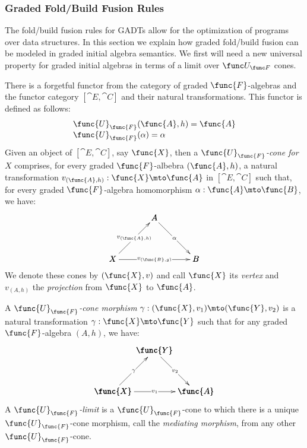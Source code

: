 \subsubsection{Graded Fold/Build Fusion Rules}
\label{subsubsec:graded_fold_build_fusion_rules}
% 
The fold/build fusion rules for GADTs allow for the optimization of
programs over data structures.  In this section we explain how graded
fold/build fusion can be modeled in graded initial algebra semantics.
% 
We first will need a new universal property for graded initial
algebras in terms of a limit over $\UFunc{F}$ cones.
%   
\begin{definition}
\label{def:forgetful_limits}
    There is a forgetful functor from the category of graded
    $\func{F}$-algebras and the functor category $[\cat{E},\cat{C}]$
    and their natural transformations. This functor is defined as
    follows:
    \[
        \begin{array}{lll}
            \func{U}_\func{F}(\func{A},h) = \func{A}\\
            \func{U}_\func{F}(\alpha) = \alpha
        \end{array}
    \]
    Given an object of $[\cat{E},\cat{C}]$, say $\func{X}$, then a
    \emph{$\func{U}_\func{F}$-cone for $X$} comprises, for every
    graded $\func{F}$-albebra $(\func{A},h)$, a natural transformation
    $v_{(\func{A},h)} : \func{X} \mto \func{A}$ in $[\cat{E},\cat{C}]$
    such that, for every graded $\func{F}$-algebra homomorphism
    $\alpha : \func{A} \mto \func{B}$, we have:
    \[
         \bfig
             \Atriangle(0,0)|mmm|/<-`->`->/<500,500>[
                 A`
                 X`
                 B;
                 v_{(\func{A},h)}`
                 \alpha`
                 v_{(\func{B},g)}
             ]
         \efig
    \]
    We denote these cones by $(\func{X},v)$ and call $\func{X}$ its
    \emph{vertex} and $v_{(A,h)}$ the \emph{projection} from
    $\func{X}$ to $\func{A}$. 
    
    A \emph{$\func{U}_\func{F}$-cone morphism} $\gamma :
    (\func{X},v_1) \mto
    (\func{Y},v_2)$ is a natural transformation $\gamma : \func{X} \mto
    \func{Y}$ such that for any graded $\func{F}$-algebra $(A,h)$, we
    have:
    \[
         \bfig
             \Atriangle(0,0)|mmm|/<-`->`->/<500,500>[
                 \func{Y}`
                 \func{X}`
                 \func{A};
                 \gamma`
                 v_2`
                 v_1
             ]
         \efig
    \]
    A \emph{$\func{U}_\func{F}$-limit} is a $\func{U}_\func{F}$-cone
    to which there is a unique $\func{U}_\func{F}$-cone morphism, call
    the \emph{mediating morphism}, from any other
    $\func{U}_\func{F}$-cone.
\end{definition}
